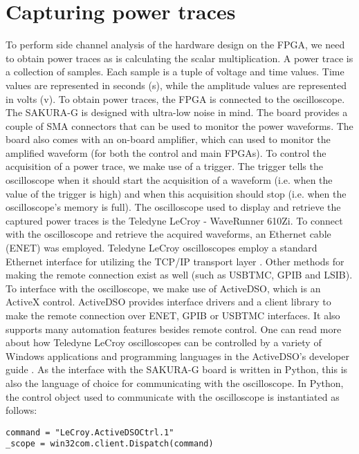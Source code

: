 \section{Capturing power traces}
To perform side channel analysis of the {\fourq} hardware design on the FPGA, we need to obtain power traces as {\fourq} is calculating the scalar multiplication.
A power trace is a collection of samples.
Each sample is a tuple of voltage and time values.
Time values are represented in seconds (s), while the amplitude values are represented in volts (v).
To obtain power traces, the FPGA is connected to the oscilloscope.
The SAKURA-G is designed with ultra-low noise in mind.
The board provides a couple of SMA connectors that can be used to monitor the power waveforms. 
The board also comes with an on-board amplifier, which can used to monitor the amplified waveform (for both the control and main FPGAs).
To control the acquisition of a power trace, we make use of a trigger.
The trigger tells the oscilloscope when it should start the acquisition of a waveform (i.e. when the value of the trigger is high) and when this acquisition should stop (i.e. when the oscilloscope's memory is full). 
The oscilloscope used to display and retrieve the captured power traces is the Teledyne LeCroy - WaveRunner 610Zi.
To connect with the oscilloscope and retrieve the acquired waveforms, an Ethernet cable (ENET) was employed.
Teledyne LeCroy oscilloscopes employ a standard Ethernet interface for utilizing the TCP/IP transport layer \cite{automation2017manual}.
Other methods for making the remote connection exist as well (such as USBTMC, GPIB and LSIB).
To interface with the oscilloscope, we make use of ActiveDSO, which is an ActiveX control.
ActiveDSO provides interface drivers and a client library to make the remote connection over ENET, GPIB or USBTMC interfaces.
It also supports many automation features besides remote control. One can read more about how Teledyne LeCroy oscilloscopes can be controlled by a variety of Windows applications and programming languages in the ActiveDSO's developer guide \cite{activedso2015guide}.
As the interface with the SAKURA-G board is written in Python, this is also the language of choice for communicating with the oscilloscope.
In Python, the control object used to communicate with the oscilloscope is instantiated as follows:
%
\begin{verbatim}
command = "LeCroy.ActiveDSOCtrl.1"
_scope = win32com.client.Dispatch(command)
\end{verbatim}
